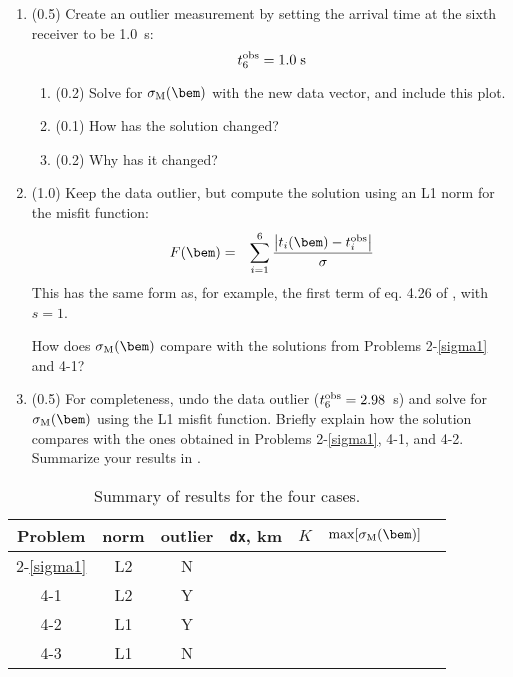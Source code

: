 \documentclass[11pt,titlepage,fleqn]{article}
\begin{document}
\begin{enumerate}
\item (0.5) Create an outlier measurement by setting the arrival time at the sixth receiver to be 1.0~s:
%
\begin{equation}
t_6^{\rm obs} = 1.0\;{\rm s}
\end{equation}

\begin{enumerate}
\item (0.2) Solve for $\sigma_{\rm M}(\bem)$ with the new data vector, and include this plot.
\item (0.1) How has the solution changed?
\item (0.2) Why has it changed?
\end{enumerate}

\item (1.0) Keep the data outlier, but compute the solution using an L1 norm for the misfit function:
%
\begin{eqnarray}
F(\bem) &=& \sum_{i=1}^6 \frac{\left| t_i(\bem) - t_i^{\rm obs}\right|}{\sigma}
\end{eqnarray}
%
This has the same form as, for example, the first term of eq. 4.26 of \citet{Tarantola2005}, with $s=1$.

How does $\sigma_{\rm M}(\bem)$ compare with the solutions from Problems 2-\ref{sigma1} and 4-1?

\item (0.5) For completeness, undo the data outlier ($t_6^{\rm obs} = 2.98$~s) and solve for $\sigma_{\rm M}(\bem)$ using the L1 misfit function.
Briefly explain how the solution compares with the ones obtained in Problems 2-\ref{sigma1}, 4-1, and 4-2.
Summarize your results in .

\end{enumerate}

\begin{table}[h]
\centering
\caption[]{
Summary of results for the four cases.
\label{tab}
}
\begin{spacing}{1.5}
\begin{tabular}{|c||c|c|c|c|c|c}
\hline\hline
Problem & norm & outlier & \verb+dx+, km & $K$ & $\max[\sigma_{\rm M}(\bem)]$ \\ \hline\hline
2-\ref{sigma1} & L2 & N & \hspace{1cm} & \hspace{3cm} & \hspace{3cm} \\ \hline
4-1            & L2 & Y &  &  & \\ \hline
4-2            & L1 & Y &  &  & \\ \hline
4-3            & L1 & N &  &  & \\ \hline
\end{tabular}
\end{spacing}
\end{table}
\end{document}
